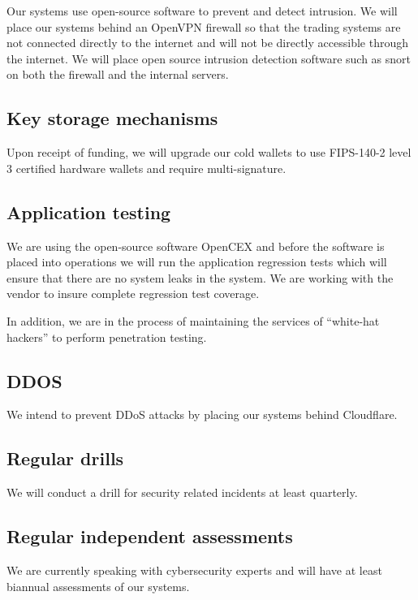 Our systems use open-source software to prevent and detect intrusion.
We will place our systems behind an OpenVPN firewall so that the
trading systems are not connected directly to the internet and will
not be directly accessible through the internet.  We will place open
source intrusion detection software such as snort on both the firewall
and the internal servers.

\subsection{Key storage mechanisms}
Upon receipt of funding, we will upgrade our cold wallets to use
FIPS-140-2 level 3 certified hardware wallets and require
multi-signature.


\subsection{Application testing}
We are using the open-source software OpenCEX and before the software is
placed into operations we will run the application regression tests
which will ensure that there are no system leaks in the system.  We
are working with the vendor to insure complete regression test
coverage.

In addition, we are in the process of maintaining the services of
``white-hat hackers'' to perform penetration testing.

\subsection{DDOS}
We intend to prevent DDoS attacks by placing our systems behind
Cloudflare.

\subsection{Regular drills}
We will conduct a drill for security related incidents at least quarterly.


\subsection{Regular independent assessments}
We are currently speaking with cybersecurity experts and will have at
least biannual assessments of our systems.


